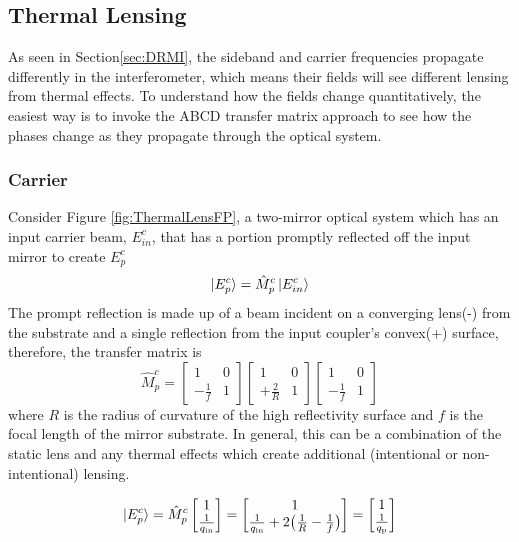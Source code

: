	\subsection{Thermal Lensing}\label{Sec:TL_lensing}
	\cite{hiro_thermal_lens}
		As seen in Section\ref{sec:DRMI}, the sideband and carrier frequencies propagate differently in the interferometer, which means their fields will see different lensing from thermal effects. To understand how the fields change quantitatively, the easiest way is to invoke the ABCD transfer matrix approach to see how the phases change as they propagate through the optical system.
		\subsubsection{Carrier}
	
		Consider Figure \ref{fig:ThermalLensFP}, a two-mirror optical system which has an input carrier beam, $E^c_{in}$, that has a portion promptly reflected off the input mirror to create $E^c_{p}$
		\begin{equation}
		\ket{E^{c}_{p}} = \hat{M}^{c}_{p} \ket{E^{c}_{in}}
		\end{equation}
		The prompt reflection is made up of a beam incident on a converging lens(-) from the substrate and a single reflection from the input coupler's convex(+) surface, therefore, the transfer matrix is
		\begin{equation}
		\hat{M}^{c}_{p} = 
		\begin{bmatrix}
						1 	&	0 
		\\ 	-\frac{1}{f} 	&	1
		\end{bmatrix}
		\begin{bmatrix}
						1 	&	0 
		\\ 	+\frac{2}{R} 	&	1
		\end{bmatrix}
		\begin{bmatrix}
						1 	&	0 
		\\ 	-\frac{1}{f} 	&	1
		\end{bmatrix}
		\end{equation}
		where $R$ is the radius of curvature of the high reflectivity surface and $f$ is the focal length of the mirror substrate. In general, this can be a combination of the static lens and any thermal effects which create additional (intentional or non-intentional) lensing.
		
		\begin{equation}\label{eq:promptE}
		 \ket{E^{c}_{p}}=
		 \hat{M}^{c}_{p}
		 \begin{bmatrix}
		 					1  
		 \\ 	\frac{1}{q_{\text{in}}}
		 \end{bmatrix}
		 =
		 \begin{bmatrix}
		 1  
		 \\ 	\frac{1}{q_{\text{in}}} + 2 \big(\frac{1}{R} - \frac{1}{f}\big)
		 \end{bmatrix}
		 =
		 \begin{bmatrix}
		 1  
		 \\ 	\frac{1}{q_{\text{p}}}
		 \end{bmatrix}
		\end{equation}
		
